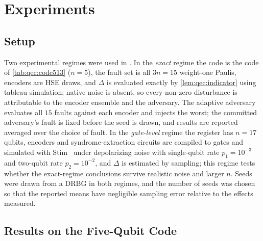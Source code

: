 \section{Experiments}\label{sec:qec:experiments}

\subsection{Setup}\label{sec:qec:setup}

Two experimental regimes were used in \cite{guo2026qecaudit}. In the \emph{exact} regime the code is the  code of \cref{tab:qec:code513} ($n=5$), the fault set is all $3n=15$ weight-one Paulis, encoders are HSE draws, and $\Delta$ is evaluated exactly by \cref{lem:qec:indicator} using tableau simulation; native noise is absent, so every non-zero disturbance is attributable to the encoder ensemble and the adversary. The adaptive adversary evaluates all $15$ faults against each encoder and injects the worst; the committed adversary's fault is fixed before the seed is drawn, and results are reported averaged over the choice of fault. In the \emph{gate-level} regime the register has $n=17$ qubits, encoders and syndrome-extraction circuits are compiled to gates and simulated with Stim~\cite{gidney2021stim} under depolarizing noise with single-qubit rate $p_1=10^{-3}$ and two-qubit rate $p_2=10^{-2}$, and $\Delta$ is estimated by sampling; this regime tests whether the exact-regime conclusions survive realistic noise and larger $n$. Seeds were drawn from a DRBG in both regimes, and the number of seeds was chosen so that the reported means have negligible sampling error relative to the effects measured.

\subsection{Results on the Five-Qubit Code}\label{sec:qec:results513}

